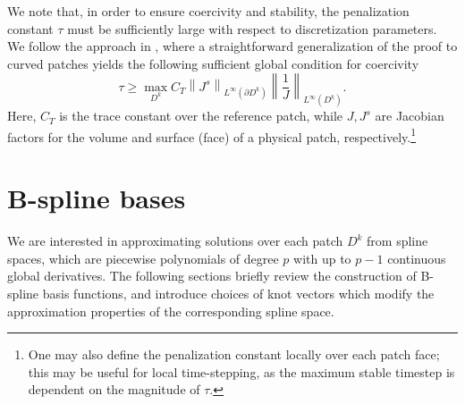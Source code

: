 \documentclass[preprint,10pt]{elsarticle}
\newcommand{\nor}[1]{\left\| #1 \right\|}
\newcommand{\LRp}[1]{\left( #1 \right)}
\begin{document}
We note that, in order to ensure coercivity and stability, the penalization constant $\tau$ must be sufficiently large with respect to discretization parameters.  We follow the approach in \cite{Shahbazi:2005:SNE:1083044.1083046}, where a straightforward generalization of the proof to curved patches yields the following sufficient global condition for coercivity
\[
\tau \geq \max_{D^k} {C_T}{\nor{J^s}_{L^\infty\LRp{\partial D^k}}\nor{\frac{1}{J}}_{L^\infty\LRp{D^k}}}.
\]
Here, $C_T$ is the trace constant over the reference patch, while $J, J^s$ are Jacobian factors for the volume and surface (face) of a physical patch, respectively.\footnote{One may also define the penalization constant locally over each patch face; this may be useful for local time-stepping, as the maximum stable timestep is dependent on the magnitude of $\tau$.}  


\section{B-spline bases}
\label{sec:basis}

We are interested in approximating solutions over each patch $D^k$ from spline spaces, which are piecewise polynomials of degree $p$ with up to $p-1$ continuous global derivatives.  The following sections briefly review the construction of B-spline basis functions, and introduce choices of knot vectors which modify the approximation properties of the corresponding spline space.
\end{document}

